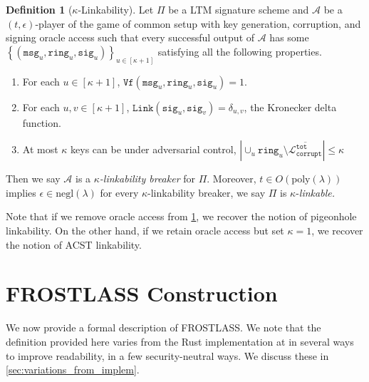 \documentclass[11pt]{article}
\theoremstyle{definition}
\newtheorem{definition}[definition]{Definition}
\newcommand{\ring}{\texttt{ring}}
\newcommand{\sig}{\texttt{sig}}
\newcommand{\secpar}{\lambda}
\newcommand{\msg}{\texttt{msg}}
\newcommand{\verify}{\texttt{Vf}}
\newcommand{\link}{\texttt{Link}}
\newcommand{\polysecpar}{O(\text{poly}(\secpar))}
\newcommand{\negl}{\text{negl}(\secpar)}
\newcommand{\corruptedTotalKeys}{\mathcal{L}_{\texttt{corrupt}}^{\texttt{tot}}}
\begin{document}
\begin{definition}[$\kappa$-Linkability]\label{def:linkable}
Let $\Pi$ be a LTM signature scheme and $\mathcal{A}$ be a $(t,\epsilon)$-player of the game of common setup with key generation, corruption, and signing oracle access such that every successful output of $\mathcal{A}$ has some $\left\{(\msg_u, \ring_u, \sig_u)\right\}_{u\in[\kappa+1]}$ satisfying all the following properties.
\begin{enumerate}
\item For each $u \in [\kappa+1]$, $\verify(\msg_u, \ring_u, \sig_u) = 1$.
\item For each $u, v \in [\kappa+1]$, $\link(\sig_u, \sig_v) = \delta_{u,v}$, the Kronecker delta function.
\item At most $\kappa$ keys can be under adversarial control, $\left|\cup_u \ring_u \setminus \overline{\corruptedTotalKeys}\right| \leq \kappa$
\end{enumerate}
Then we say $\mathcal{A}$ is a \textit{$\kappa$-linkability breaker} for $\Pi$. Moreover, $t \in \polysecpar$ implies $\epsilon \in \negl$ for every $\kappa$-linkability breaker, we say $\Pi$ is $\kappa$-\textit{linkable.}
\end{definition}

Note that if we remove oracle access from \cref{def:linkable}, we recover the notion of pigeonhole linkability. On the other hand, if we retain oracle access but set $\kappa = 1$, we recover the notion of ACST linkability.


\section{FROSTLASS Construction}

We now provide a formal description of FROSTLASS. We note that the definition provided here varies from the Rust implementation at \cite{SeraiRepo} in several ways to improve readability, in a few security-neutral ways. We discuss these in \cref{sec:variations_from_implem}.
\end{document}
